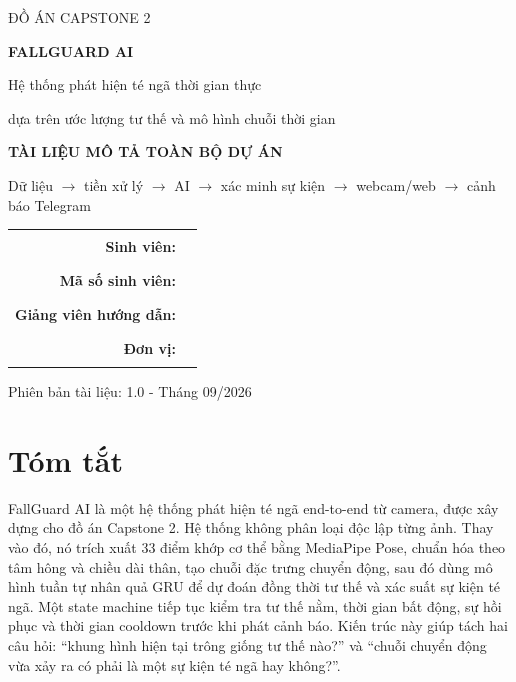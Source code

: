\documentclass[12pt,a4paper,oneside]{report}
\begin{document}
\begin{titlepage}
\pagecolor{fgNavy}
\color{white}
\begin{center}
  \vspace*{1.1cm}
  {\sffamily\Large ĐỒ ÁN CAPSTONE 2\par}
  \vspace{1.6cm}
  {\sffamily\bfseries\fontsize{32}{38}\selectfont FALLGUARD AI\par}
  \vspace{0.4cm}
  {\sffamily\Large Hệ thống phát hiện té ngã thời gian thực\par}
  \vspace{0.2cm}
  {\sffamily\large dựa trên ước lượng tư thế và mô hình chuỗi thời gian\par}
  \vspace{1.3cm}
  \begin{tcolorbox}[width=0.86\textwidth,colback=fgNavy!85!black,colframe=fgCyan,
      coltext=white,boxrule=1.2pt,arc=3mm]
  \centering
  \textbf{TÀI LIỆU MÔ TẢ TOÀN BỘ DỰ ÁN}\par
  \vspace{0.3cm}
  Dữ liệu $\rightarrow$ tiền xử lý $\rightarrow$ AI $\rightarrow$ xác minh sự kiện
  $\rightarrow$ webcam/web $\rightarrow$ cảnh báo Telegram
  \end{tcolorbox}
  \vfill
  \begin{tabular}{rl}
    \textbf{Sinh viên:} & \rule{8cm}{0.4pt} \\
    \textbf{Mã số sinh viên:} & \rule{8cm}{0.4pt} \\
    \textbf{Giảng viên hướng dẫn:} & \rule{8cm}{0.4pt} \\
    \textbf{Đơn vị:} & \rule{8cm}{0.4pt}
  \end{tabular}
  \vfill
  {\sffamily Phiên bản tài liệu: 1.0 - Tháng 09/2026\par}
\end{center}
\end{titlepage}
\nopagecolor
\color{black}

\chapter*{Tóm tắt}

FallGuard AI là một hệ thống phát hiện té ngã end-to-end từ camera, được xây dựng
cho đồ án Capstone 2. Hệ thống không phân loại độc lập từng ảnh. Thay vào đó, nó
trích xuất 33 điểm khớp cơ thể bằng MediaPipe Pose, chuẩn hóa theo tâm hông và
chiều dài thân, tạo chuỗi đặc trưng chuyển động, sau đó dùng mô hình tuần tự nhân
quả GRU để dự đoán đồng thời tư thế và xác suất sự kiện té ngã. Một state machine
tiếp tục kiểm tra tư thế nằm, thời gian bất động, sự hồi phục và thời gian
cooldown trước khi phát cảnh báo. Kiến trúc này giúp tách hai câu hỏi: ``khung
hình hiện tại trông giống tư thế nào?'' và ``chuỗi chuyển động vừa xảy ra có phải
là một sự kiện té ngã hay không?''.
\end{document}
